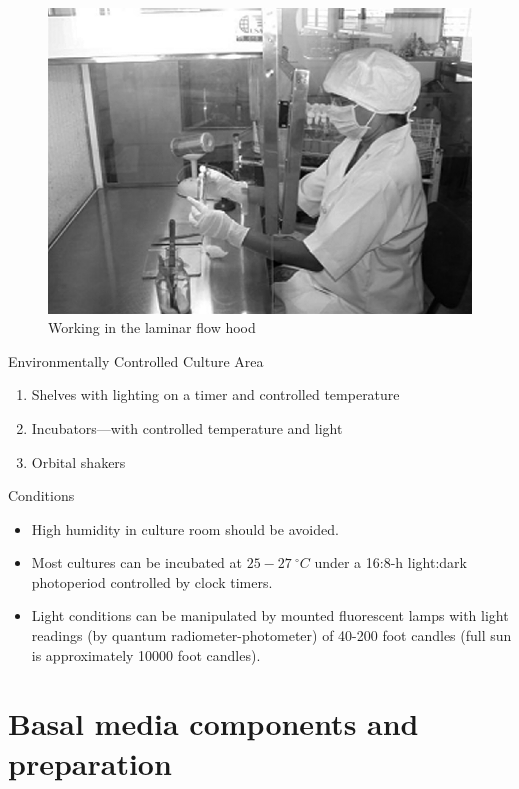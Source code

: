\documentclass[
  ignorenonframetext,
  aspectratio=169]{beamer}
\providecommand{\tightlist}{%
  \setlength{\itemsep}{0pt}\setlength{\parskip}{0pt}}
\begin{document}
\begin{frame}{}
\protect\hypertarget{section-1}{}
\begin{figure}
\includegraphics[width=0.4\linewidth]{../images/laminar_flow_hood} \caption{Working in the laminar flow hood}\label{fig:aseptic-transfer}
\end{figure}
\end{frame}

\begin{frame}{Environmentally Controlled Culture Area}
\protect\hypertarget{environmentally-controlled-culture-area}{}
\begin{enumerate}
\tightlist
\item
  Shelves with lighting on a timer and controlled temperature
\item
  Incubators---with controlled temperature and light
\item
  Orbital shakers
\end{enumerate}
\end{frame}

\begin{frame}{Conditions}
\protect\hypertarget{conditions}{}
\begin{itemize}
\tightlist
\item
  High humidity in culture room should be avoided.
\item
  Most cultures can be incubated at \(25-27~^\circ C\) under a 16:8-h
  light:dark photoperiod controlled by clock timers.
\item
  Light conditions can be manipulated by mounted fluorescent lamps with
  light readings (by quantum radiometer-photometer) of 40-200 foot
  candles (full sun is approximately 10000 foot candles).
\end{itemize}
\end{frame}

\hypertarget{basal-media-components-and-preparation}{%
\section{Basal media components and
preparation}\label{basal-media-components-and-preparation}}
\end{document}
